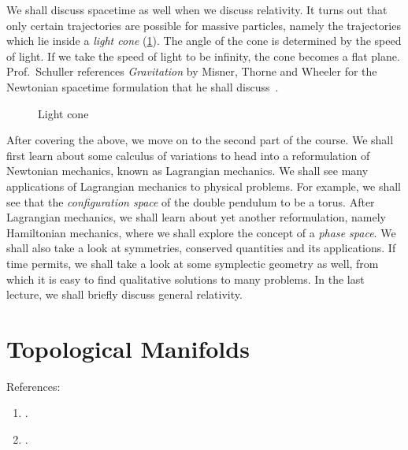 \documentclass[a4 paper, oneside, 12pt]{book}
\theoremstyle{definition}
\begin{document}
	We shall discuss spacetime as well when we discuss relativity. It turns out that only certain trajectories are possible for massive particles, namely the trajectories which lie inside a \textit{light cone} (\cref{fig:lightcone}). The angle of the cone is determined by the speed of light. If we take the speed of light to be infinity, the cone becomes a flat plane. Prof.\ Schuller references \textit{Gravitation} by Misner, Thorne and Wheeler for the Newtonian spacetime formulation that he shall discuss~\cite{Misner}.

	\begin{figure}[htb]
	    \centering
		\caption{Light cone}
		\label{fig:lightcone}
	\end{figure}

	After covering the above, we move on to the second part of the course. We shall first learn about some calculus of variations to head into a reformulation of Newtonian mechanics, known as Lagrangian mechanics. We shall see many applications of Lagrangian mechanics to physical problems. For example, we shall see that the \textit{configuration space} of the double pendulum to be a torus. After Lagrangian mechanics, we shall learn about yet another reformulation, namely Hamiltonian mechanics, where we shall explore the concept of a \textit{phase space}. We shall also take a look at symmetries, conserved quantities and its applications. If time permits, we shall take a look at some symplectic geometry as well, from which it is easy to find qualitative solutions to many problems. In the last lecture, we shall briefly discuss general relativity.

	\chapter{Topological Manifolds}

	References:
	\begin{enumerate}
		\item {}.
		\item {}.
	\end{enumerate}
\end{document}

